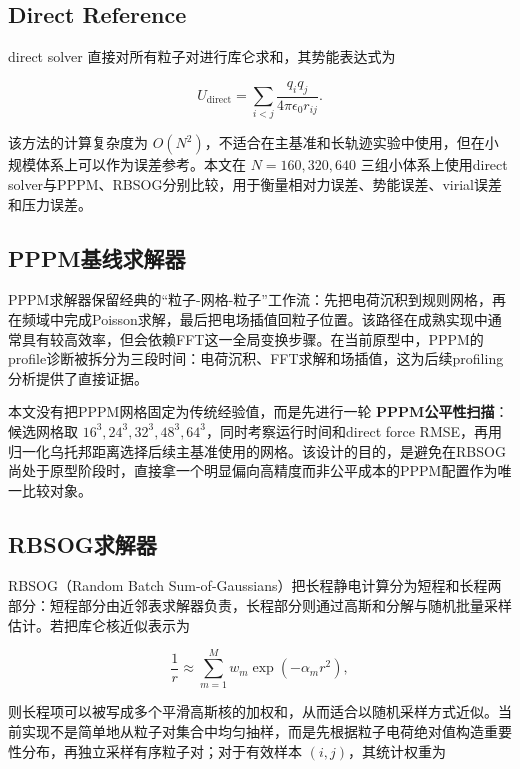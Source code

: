 \subsection{Direct Reference}

direct solver 直接对所有粒子对进行库仑求和，其势能表达式为

\begin{equation}
U_{\mathrm{direct}} = \sum_{i<j} \frac{q_i q_j}{4\pi \epsilon_0 r_{ij}}.
\label{eq:method_direct}
\end{equation}

该方法的计算复杂度为 $O(N^2)$，不适合在主基准和长轨迹实验中使用，但在小规模体系上可以作为误差参考。本文在 $N=160,320,640$ 三组小体系上使用direct solver与PPPM、RBSOG分别比较，用于衡量相对力误差、势能误差、virial误差和压力误差。

\subsection{PPPM基线求解器}

PPPM求解器保留经典的“粒子-网格-粒子”工作流：先把电荷沉积到规则网格，再在频域中完成Poisson求解，最后把电场插值回粒子位置。该路径在成熟实现中通常具有较高效率，但会依赖FFT这一全局变换步骤\cite{darden1993particle,hockney1988computer}。在当前原型中，PPPM的profile诊断被拆分为三段时间：电荷沉积、FFT求解和场插值，这为后续profiling分析提供了直接证据。

本文没有把PPPM网格固定为传统经验值，而是先进行一轮 \textbf{PPPM公平性扫描}：候选网格取 $16^3,24^3,32^3,48^3,64^3$，同时考察运行时间和direct force RMSE，再用归一化乌托邦距离选择后续主基准使用的网格。该设计的目的，是避免在RBSOG尚处于原型阶段时，直接拿一个明显偏向高精度而非公平成本的PPPM配置作为唯一比较对象。

\subsection{RBSOG求解器}

RBSOG（Random Batch Sum-of-Gaussians）把长程静电计算分为短程和长程两部分：短程部分由近邻表求解器负责，长程部分则通过高斯和分解与随机批量采样估计。若把库仑核近似表示为

\begin{equation}
\frac{1}{r} \approx \sum_{m=1}^{M} w_m \exp(-\alpha_m r^2),
\label{eq:method_sog}
\end{equation}

则长程项可以被写成多个平滑高斯核的加权和，从而适合以随机采样方式近似。当前实现不是简单地从粒子对集合中均匀抽样，而是先根据粒子电荷绝对值构造重要性分布，再独立采样有序粒子对；对于有效样本 $(i,j)$，其统计权重为

